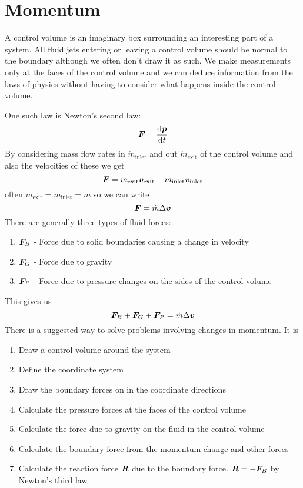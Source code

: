\documentclass{article}
\begin{document}
    \section{Momentum}
    A control volume is an imaginary box surrounding an interesting part of a system.
    All fluid jets entering or leaving a control volume should be normal to the boundary although we often don't draw it as such.
    We make measurements only at the faces of the control volume and we can deduce information from the laws of physics without having to consider what happens inside the control volume.
    
    One such law is Newton's second law:
    \[\bm{F} = \dv{\bm{p}}{t}\]
    By considering mass flow rates in \(\dot m_\text{inlet}\) and out \(\dot m_\text{exit}\) of the control volume and also the velocities of these we get
    \[\bm{F} = \dot m_\text{exit}\bm{v}_\text{exit} - \dot m_\text{inlet}\bm{v}_\text{inlet}\]
    often \(\dot m_\text{exit} = \dot m_\text{inlet} = \dot m\) so we can write
    \[\bm{F} = \dot m\Delta \bm{v}\]
    There are generally three types of fluid forces:
    \begin{enumerate}
        \item \(\bm{F}_B\) - Force due to solid boundaries causing a change in velocity
        \item \(\bm{F}_G\) - Force due to gravity
        \item \(\bm{F}_P\) - Force due to pressure changes on the sides of the control volume
    \end{enumerate}
    This gives us
    \[\bm{F}_B + \bm{F}_G + \bm{F}_P = \dot m\Delta \bm{v}\]
    There is a suggested way to solve problems involving changes in momentum.
    It is
    \begin{enumerate}
        \item Draw a control volume around the system
        \item Define the coordinate system
        \item Draw the boundary forces on in the coordinate directions
        \item Calculate the pressure forces at the faces of the control volume
        \item Calculate the force due to gravity on the fluid in the control volume
        \item Calculate the boundary force from the momentum change and other forces
        \item Calculate the reaction force \(\bm{R}\) due to the boundary force. \(\bm{R} = -\bm{F}_B\) by Newton's third law
    \end{enumerate}
    
\end{document}
